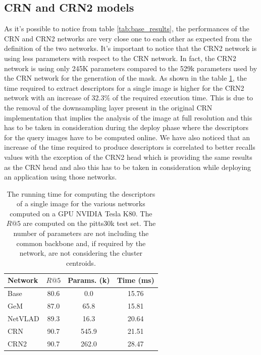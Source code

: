 \documentclass[10pt,twocolumn,letterpaper]{article}
\begin{document}
\subsection{CRN and CRN2 models}
As it's possible to notice from table \ref{tab:base_results}, the performances of the CRN and CRN2 networks are very close one to each other as expected
from the definition of the two networks. It's important to notice that the CRN2 network is using less parameters with respect to the CRN network. In fact,
the CRN2 network is using only 245K parameters compared to the 529k parameters used by the CRN network for the generation of the mask.
As shown in the table \ref{tab:time}, the time required to extract descriptors for a single image is higher for the CRN2 network with an increase of 32.3\% 
of the required execution time. This is due to the removal of the downsampling layer present in the original CRN implementation that implies the analysis of the image 
at full resolution and this 
has to be taken in consideration during the deploy phase where the descriptors for the query images have to be computed online. We have also noticed that an increase
of the time required to produce descriptors is correlated to better recalls values with the exception of the CRN2 head which is providing the same results as the CRN head
and also this has to be taken in consideration while deploying an application using those networks.

\begin{table}
   \centering
   \begin{tabular}{|l|c|c|c|}
      \hline
      Network   &  $R@5$&Params. (k) &  Time (ms)\\\hline
      Base      &  80.6 &  	 0.0  	 &  15.76\\
      GeM       &  87.0 &  	65.8  	 &  15.81\\
      NetVLAD   &  89.3 &  	16.3  	 &  20.64\\
      CRN       &  90.7 &  545.9  	 &  21.51\\
      CRN2      &  90.7 &  262.0  	 &  28.47\\\hline
   \end{tabular}
   \caption{The running time for computing the descriptors of a single image for the various networks computed on a GPU NVIDIA Tesla K80. The $R@5$ are computed on the pitts30k test set.
   The number of parameters are not including the common backbone and, if required by the network, are not considering the cluster centroids. }
   \label{tab:time}
\end{table}
\end{document}
